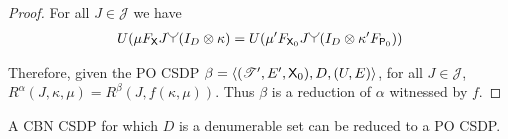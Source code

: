 \begin{proof}
For all $J\in \mathscr{J}$ we have
\begin{align}
    U(\mu F_{\RV{X}} J\splitter{0.13}(I_D\otimes \kappa) &= U(\mu' F_{\RV{X}_0} J\splitter{0.13}(I_D\otimes \kappa' F_{\RV{P}_0}))\\
\end{align}

Therefore, given the PO CSDP $\beta=\langle (\mathscr{T}',E',\mathsf{X}_0),D,(U,E) \rangle$, for all $J\in \mathscr{J}$, $R^\alpha(J,\kappa,\mu)=R^\beta(J,f(\kappa,\mu))$. Thus $\beta$  is a reduction of $\alpha$ witnessed by $f$.
\end{proof}

\begin{corollary}
A CBN CSDP for which $D$ is a denumerable set can be reduced to a PO CSDP.
\end{corollary}

